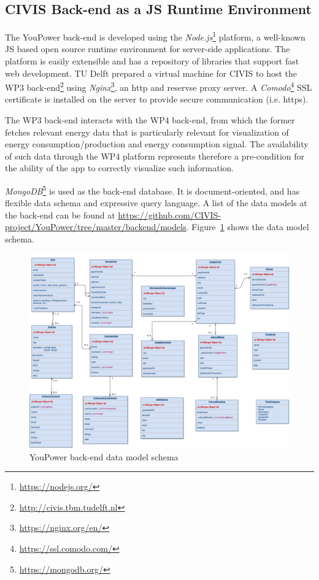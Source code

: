 
\subsection{CIVIS Back-end as a JS Runtime Environment}

The YouPower back-end is developed using the \textit{Node.js}\footnote{\url{https://nodejs.org/}} platform, a well-known JS based open source runtime environment for server-side applications. 
The platform is easily extensible and has a repository of libraries that support fast web development. 
% 
TU Delft prepared a virtual machine for CIVIS to host the WP3 back-end\footnote{\url{http://civis.tbm.tudelft.nl}}
using \textit{Nginx}\footnote{\url{https://nginx.org/en/}}, an http and reservse proxy server. 
% 
A \textit{Comodo}\footnote{\url{https://ssl.comodo.com/}} SSL certificate is installed on the server to provide secure communication (i.e. https). 

% 
The WP3 back-end interacts with the WP4 back-end, from which the former fetches relevant energy data that is particularly relevant for visualization of energy consumption/production and energy consumption signal. The availability of such data through the WP4 platform represents therefore a pre-condition for the ability of the app to correctly visualize such information.

\textit{MongoDB}\footnote{\url{https://mongodb.org/}} is used as the back-end database. It is document-oriented, and has flexible data schema and expressive query language. 
A list of the data models at the back-end can be found at {\footnotesize\url{https://github.com/CIVIS-project/YouPower/tree/master/backend/models}}. 
Figure~\ref{fig:datamodel} shows the data model schema.
%
\begin{figure}
\centering
\includegraphics[height=.92\linewidth,angle=90]{img/7sdatamodel}
\caption{YouPower back-end data model schema}
\label{fig:datamodel}
\end{figure} 
% 

